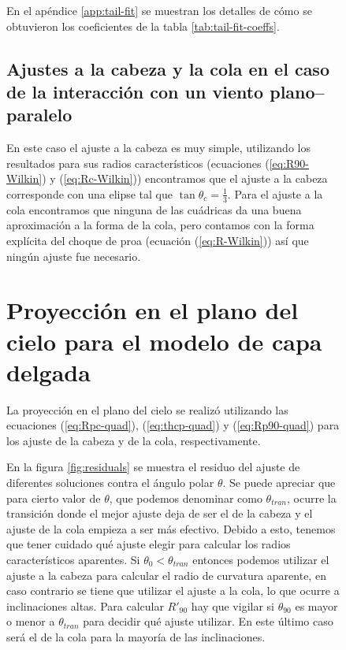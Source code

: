 \begin{figure}
 
 En el apéndice \ref{app:tail-fit} se muestran los detalles de cómo se obtuvieron los coeficientes de la tabla \ref{tab:tail-fit-coeffs}. 
 
 \subsection{Ajustes a la cabeza y la cola en el caso de la interacción con un viento plano--paralelo}

 En este caso el ajuste a la cabeza es muy simple, utilizando los resultados para sus radios característicos (ecuaciones (\ref{eq:R90-Wilkin}) y (\ref{eq:Rc-Wilkin})) encontramos que el ajuste a la cabeza corresponde con una elipse tal que $\tan\theta_c = \frac{1}{3}$.
 Para el ajuste a la cola encontramos que ninguna de las cuádricas da una buena aproximación a la forma de la  cola, pero contamos con la forma explícita del choque de proa (ecuación (\ref{eq:R-Wilkin})) así que ningún ajuste fue necesario.
 
 \section{Proyección en el plano del cielo para el modelo de capa delgada}
\label{sec:proyection-CRW}
 La proyección en el plano del cielo se realizó utilizando las ecuaciones (\ref{eq:Rpc-quad}), (\ref{eq:thcp-quad}) y (\ref{eq:Rp90-quad}) para los ajuste de la cabeza y de la cola, respectivamente.

 En la figura \ref{fig:residuals} se muestra el residuo del ajuste de diferentes soluciones contra el ángulo polar $\theta$. Se puede apreciar que para cierto valor de $\theta$, que podemos denominar como $\theta_{tran}$, ocurre la transición donde el mejor ajuste deja de ser el de la cabeza y el ajuste de la cola empieza a ser más efectivo. Debido a esto, tenemos que tener cuidado qué ajuste elegir para calcular los radios característicos aparentes. Si $\theta_0 < \theta_{tran}$ entonces podemos utilizar el ajuste a la cabeza para calcular el radio de curvatura aparente, en caso contrario se tiene que utilizar el ajuste a la cola, lo que ocurre a inclinaciones altas. Para calcular $R'_{90}$ hay que vigilar si $\theta_{90}$ es mayor o menor a $\theta_{tran}$ para decidir qué ajuste utilizar. En este último caso será el de la cola para la mayoría de las inclinaciones.


\end{figure}
